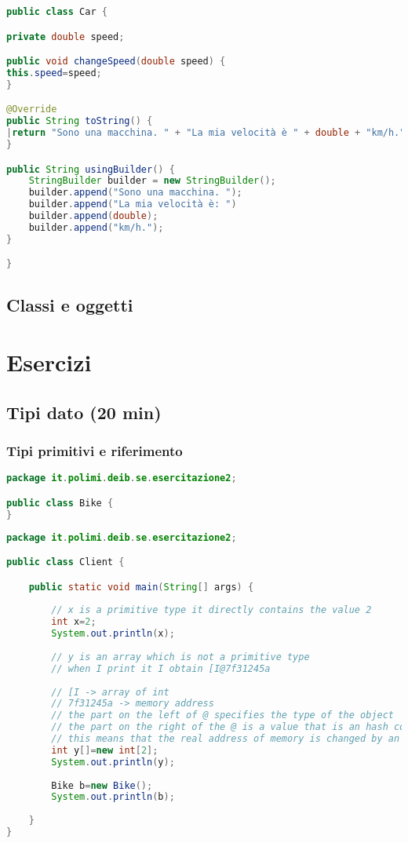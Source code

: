 \documentclass{article}
\begin{document}
\begin{lstlisting}[language=Java,escapechar=|]
public class Car {

private double speed;

public void changeSpeed(double speed) {
this.speed=speed;   
}

@Override
public String toString() {
|return "Sono una macchina. " + "La mia velocità è " + double + "km/h.";|
}

public String usingBuilder() {
	StringBuilder builder = new StringBuilder();
	builder.append("Sono una macchina. ");
    builder.append("La mia velocità è: ")
	builder.append(double);
	builder.append("km/h.");
}

}
\end{lstlisting}

\subsection{Classi e oggetti}


\section{Esercizi}


\subsection{Tipi dato (20 min)} 

\subsubsection{Tipi primitivi e riferimento}
\begin{lstlisting}[language=Java,escapechar=|]
package it.polimi.deib.se.esercitazione2;

public class Bike {	
}
\end{lstlisting}

\begin{lstlisting}[language=Java,escapechar=|]
package it.polimi.deib.se.esercitazione2;

public class Client {

	public static void main(String[] args) {
		
		// x is a primitive type it directly contains the value 2
		int x=2;
		System.out.println(x);
		
		// y is an array which is not a primitive type 
		// when I print it I obtain [I@7f31245a
		
		// [I -> array of int
		// 7f31245a -> memory address
		// the part on the left of @ specifies the type of the object
		// the part on the right of the @ is a value that is an hash code of the memory address in which the object is allocated
		// this means that the real address of memory is changed by an hashing function before being printed
		int y[]=new int[2];
		System.out.println(y);
		
		Bike b=new Bike();
		System.out.println(b);
		
	}
}
\end{lstlisting}
\end{document}
